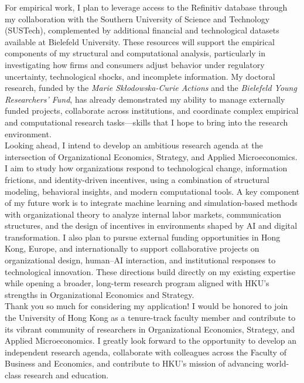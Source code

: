 \documentclass{nfr}
\begin{document}
For empirical work, I plan to leverage access to the Refinitiv database through my collaboration with the Southern University of Science and Technology (SUSTech), complemented by additional financial and technological datasets available at Bielefeld University. 
These resources will support the empirical components of my structural and computational analysis, particularly in investigating how firms and consumers adjust behavior under regulatory uncertainty, technological shocks, and incomplete information. 
My doctoral research, funded by the \textit{Marie Skłodowska-Curie Actions} and the \textit{Bielefeld Young Researchers’ Fund}, has already demonstrated my ability to manage externally funded projects, collaborate across institutions, and coordinate complex empirical and computational research tasks—skills that I hope to bring into the research environment.\\

Looking ahead, I intend to develop an ambitious research agenda at the intersection of Organizational Economics, Strategy, and Applied Microeconomics. 
I aim to study how organizations respond to technological change, information frictions, and identity-driven incentives, using a combination of structural modeling, behavioral insights, and modern computational tools. 
A key component of my future work is to integrate machine learning and simulation-based methods with organizational theory to analyze internal labor markets, communication structures, and the design of incentives in environments shaped by AI and digital transformation. 
I also plan to pursue external funding opportunities in Hong Kong, Europe, and internationally to support collaborative projects on organizational design, human–AI interaction, and institutional responses to technological innovation. 
These directions build directly on my existing expertise while opening a broader, long-term research program aligned with HKU’s strengths in Organizational Economics and Strategy.\\

Thank you so much for considering my application! 
I would be honored to join the University of Hong Kong as a tenure-track faculty member and contribute to its vibrant community of researchers in Organizational Economics, Strategy, and Applied Microeconomics. 
I greatly look forward to the opportunity to develop an independent research agenda, collaborate with colleagues across the Faculty of Business and Economics, and contribute to HKU’s mission of advancing world-class research and education.
\vspace{3mm}
\end{document}
